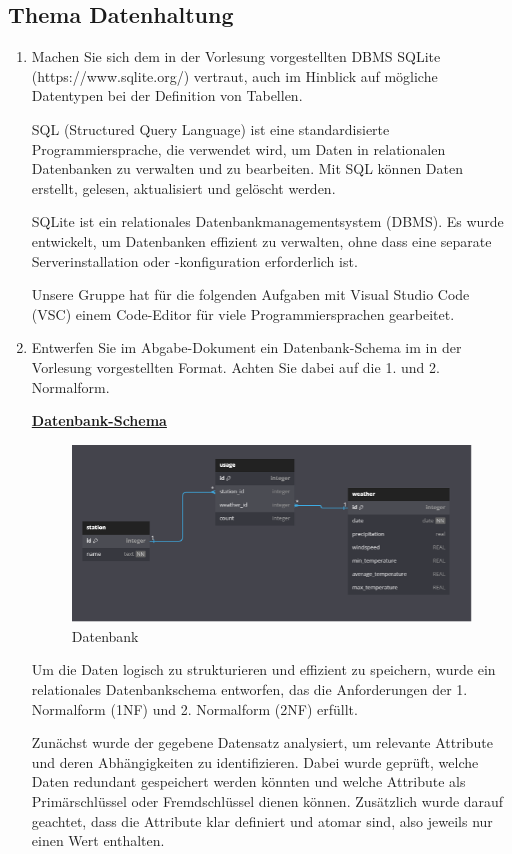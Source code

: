 \documentclass{article}
\begin{document}
\subsection{Thema Datenhaltung}
\begin{enumerate}
\item Machen Sie sich dem in der Vorlesung vorgestellten DBMS SQLite (https://www.sqlite.org/) vertraut, auch im Hinblick auf mögliche Datentypen bei der Definition von Tabellen.

 SQL (Structured Query Language) ist eine standardisierte Programmiersprache, die verwendet wird, um Daten in relationalen Datenbanken zu verwalten und zu bearbeiten. Mit SQL können Daten erstellt, gelesen, aktualisiert und gelöscht werden.

 SQLite ist ein relationales Datenbankmanagementsystem (DBMS). Es wurde entwickelt, um Datenbanken effizient zu verwalten, ohne dass eine separate Serverinstallation oder -konfiguration erforderlich ist. 

 Unsere Gruppe hat für die folgenden Aufgaben mit Visual Studio Code (VSC) einem Code-Editor für viele Programmiersprachen gearbeitet.

\newpage
\item Entwerfen Sie im Abgabe-Dokument ein Datenbank-Schema im in der Vorlesung vorgestellten Format. Achten Sie dabei auf die 1. und 2. Normalform.

\underline{\textbf{Datenbank-Schema}}
\begin{figure}[h]
    \centering
    \includegraphics[width=0.7\linewidth]{Datenbank-Schema.png}
    \caption{Datenbank}
    \label{fig:Schema}
\end{figure}


Um die Daten logisch zu strukturieren und effizient zu speichern, wurde ein relationales Datenbankschema entworfen, das die Anforderungen der 1. Normalform (1NF) und 2. Normalform (2NF) erfüllt.

Zunächst wurde der gegebene Datensatz analysiert, um relevante Attribute und deren Abhängigkeiten zu identifizieren. Dabei wurde geprüft, welche Daten redundant gespeichert werden könnten und welche Attribute als Primärschlüssel oder Fremdschlüssel dienen können. Zusätzlich wurde darauf geachtet, dass die Attribute klar definiert und atomar sind, also jeweils nur einen Wert enthalten.
    

\end{enumerate}
\end{document}
